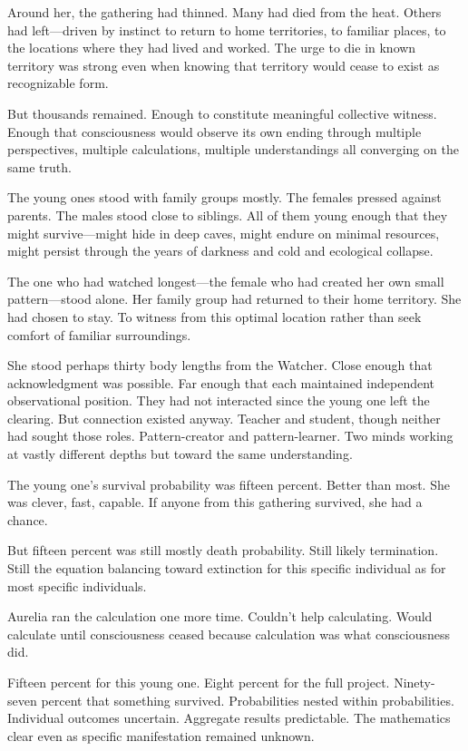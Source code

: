 Around her, the gathering had thinned. Many had died from the heat. Others had left—driven by instinct to return to home territories, to familiar places, to the locations where they had lived and worked. The urge to die in known territory was strong even when knowing that territory would cease to exist as recognizable form.

But thousands remained. Enough to constitute meaningful collective witness. Enough that consciousness would observe its own ending through multiple perspectives, multiple calculations, multiple understandings all converging on the same truth.

The young ones stood with family groups mostly. The females pressed against parents. The males stood close to siblings. All of them young enough that they might survive—might hide in deep caves, might endure on minimal resources, might persist through the years of darkness and cold and ecological collapse.

The one who had watched longest—the female who had created her own small pattern—stood alone. Her family group had returned to their home territory. She had chosen to stay. To witness from this optimal location rather than seek comfort of familiar surroundings.

She stood perhaps thirty body lengths from the Watcher. Close enough that acknowledgment was possible. Far enough that each maintained independent observational position. They had not interacted since the young one left the clearing. But connection existed anyway. Teacher and student, though neither had sought those roles. Pattern-creator and pattern-learner. Two minds working at vastly different depths but toward the same understanding.

The young one's survival probability was fifteen percent. Better than most. She was clever, fast, capable. If anyone from this gathering survived, she had a chance.

But fifteen percent was still mostly death probability. Still likely termination. Still the equation balancing toward extinction for this specific individual as for most specific individuals.

Aurelia ran the calculation one more time. Couldn't help calculating. Would calculate until consciousness ceased because calculation was what consciousness did.

Fifteen percent for this young one. Eight percent for the full project. Ninety-seven percent that something survived. Probabilities nested within probabilities. Individual outcomes uncertain. Aggregate results predictable. The mathematics clear even as specific manifestation remained unknown.

